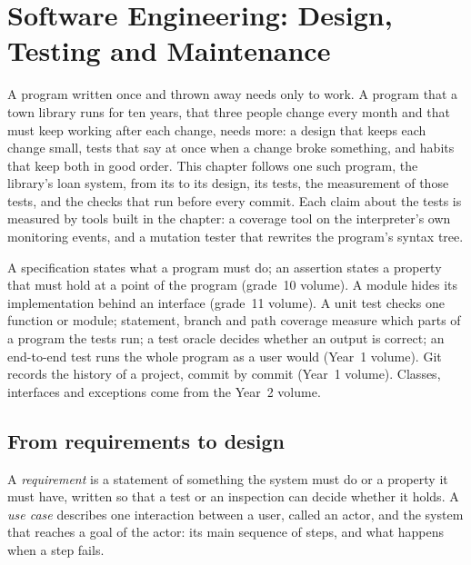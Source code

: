 \chapter{Software Engineering: Design, Testing and Maintenance}\label{ch:b3:software-engineering}

A program written once and thrown away needs only to work. A program that a town library runs for ten years, that three people change every month and that must keep working after each change, needs more: a design that keeps each change small, tests that say at once when a change broke something, and habits that keep both in good order. This chapter follows one such program, the library's loan system, from its  to its design, its tests, the measurement of those tests, and the checks that run before every commit. Each claim about the tests is measured by tools built in the chapter: a coverage tool on the interpreter's own monitoring events, and a mutation tester that rewrites the program's syntax tree.

\begin{recall}
A specification states what a program must do; an assertion states a property that must hold at a point of the program (grade~10 volume). A module hides its implementation behind an interface (grade~11 volume). A unit test checks one function or module; statement, branch and path coverage measure which parts of a program the tests run; a test oracle decides whether an output is correct; an end-to-end test runs the whole program as a user would (Year~1 volume). Git records the history of a project, commit by commit (Year~1 volume). Classes, interfaces and exceptions come from the Year~2 volume.
\end{recall}

\section{From requirements to design}\label{sec:b3:software-engineering:requirements}

\begin{definition}\label{def:b3:software-engineering:requirements}
A \emph{requirement} is a statement of something the system must do or a property it must have, written so that a test or an inspection can decide whether it holds. A \emph{use case} describes one interaction between a user, called an actor, and the system that reaches a goal of the actor: its main sequence of steps, and what happens when a step fails.
\end{definition}

